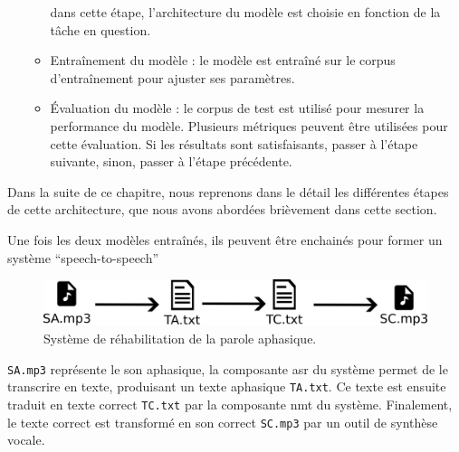 \begin{enumerate}[label=(\roman*)]
\begin{itemize}
        dans cette étape, l'architecture du modèle est choisie en fonction de la tâche en question.
        \item Entraînement du modèle :
        le modèle est entraîné sur le corpus d'entraînement pour ajuster ses paramètres.
        \item Évaluation du modèle :
        le corpus de test est utilisé pour mesurer la performance du modèle.
        Plusieurs métriques peuvent être utilisées pour cette évaluation.
        Si les résultats sont satisfaisants, passer à l'étape suivante, sinon, passer à l'étape précédente.
    \end{itemize}
\end{enumerate}

Dans la suite de ce chapitre, 
nous reprenons dans le détail les différentes étapes de cette architecture, 
que nous avons abordées brièvement dans cette section.

Une fois les deux modèles entraînés,
ils peuvent être enchainés pour former un système ``\foreignlanguage{english}{speech-to-speech}''
\begin{figure}[hbt]
    \begin{center}
        \includegraphics[width=\textwidth]{assets/images/detail.png}
    \end{center}
    \caption{Système de réhabilitation de la parole aphasique.}
    \label{fig.sp2sp}
\end{figure}
\texttt{SA.mp3} représente le son aphasique,
la composante \gls{asr} du système permet de le transcrire en texte, produisant un texte aphasique \texttt{TA.txt}.
Ce texte est ensuite traduit en texte correct \texttt{TC.txt} par la composante \gls{nmt} du système.
Finalement, le texte correct est transformé en son correct \texttt{SC.mp3} par un outil de synthèse vocale.
